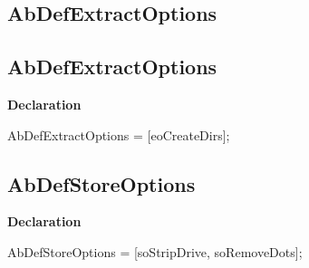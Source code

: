 \documentclass{report}
\newif\ifpdf
\begin{document}
\subsection*{\large{\textbf{AbDefExtractOptions}}\normalsize\hspace{1ex}\hrulefill}
\else
\subsection*{AbDefExtractOptions}
\fi
\label{AbArcTyp-AbDefExtractOptions}
\begin{list}{}{
\setlength{\itemindent}{0cm}
\setlength{\listparindent}{0cm}
\setlength{\leftmargin}{\evensidemargin}
\addtolength{\leftmargin}{\tmplength}
\settowidth{\labelsep}{X}
\addtolength{\leftmargin}{\labelsep}
\setlength{\labelwidth}{\tmplength}
}
\item[\textbf{Declaration}\hfill]
\ifpdf
\begin{flushleft}
\fi
\begin{ttfamily}
AbDefExtractOptions = [eoCreateDirs];\end{ttfamily}

\ifpdf
\end{flushleft}
\fi

\end{list}
\ifpdf
\subsection*{\large{\textbf{AbDefStoreOptions}}\normalsize\hspace{1ex}\hrulefill}
\else
\subsection*{AbDefStoreOptions}
\fi
\label{AbArcTyp-AbDefStoreOptions}
\begin{list}{}{
\setlength{\itemindent}{0cm}
\setlength{\listparindent}{0cm}
\setlength{\leftmargin}{\evensidemargin}
\addtolength{\leftmargin}{\tmplength}
\settowidth{\labelsep}{X}
\addtolength{\leftmargin}{\labelsep}
\setlength{\labelwidth}{\tmplength}
}
\item[\textbf{Declaration}\hfill]
\ifpdf
\begin{flushleft}
\fi
\begin{ttfamily}
AbDefStoreOptions = [soStripDrive, soRemoveDots];\end{ttfamily}

\ifpdf
\end{flushleft}
\fi

\end{list}
\ifpdf
\end{document}
